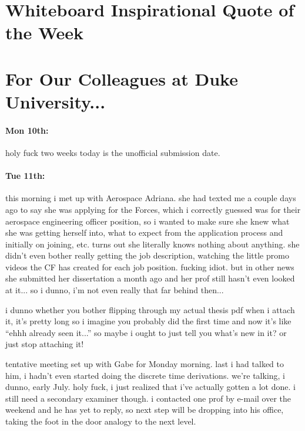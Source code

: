 \documentclass[12pt]{article}
\begin{document}
\newpage
\section*{Whiteboard Inspirational Quote of the Week}

\section*{For Our Colleagues at Duke University...}
\paragraph{Mon 10th:} holy fuck two weeks today is the unofficial submission date. 

\paragraph{Tue 11th:} this morning i met up with Aerospace Adriana. she had texted me a couple days ago to say she was applying for the Forces, which i correctly guessed was for their aerospace engineering officer position, so i wanted to make sure she knew what she was getting herself into, what to expect from the application process and initially on joining, etc. turns out she literally knows nothing about anything. she didn't even bother really getting the job description, watching the little promo videos the CF has created for each job position. fucking idiot. but in other news she submitted her dissertation a month ago and her prof still hasn't even looked at it... so i dunno, i'm not even really that far behind then... \par 
i dunno whether you bother flipping through my actual thesis pdf when i attach it, it's pretty long so i imagine you probably did the first time and now it's like ``ehhh already seen it...'' so maybe i ought to just tell you what's new in it? or just stop attaching it! \par 
tentative meeting set up with Gabe for Monday morning. last i had talked to him, i hadn't even started doing the discrete time derivations. we're talking, i dunno, early July. holy fuck, i just realized that i've actually gotten a lot done. i still need a secondary examiner though. i contacted one prof by e-mail over the weekend and he has yet to reply, so next step will be dropping into his office, taking the foot in the door analogy to the next level. 
\end{document}
